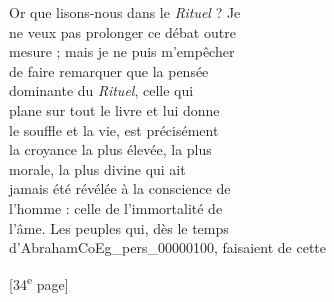 \documentclass{book}
\begin{document}
{\begin{paracol}{2}
Or que lisons-nous dans le \textit{Rituel} ? Je\\
ne veux pas prolonger ce débat outre\\
mesure ; mais je ne puis m’empêcher\\
de faire remarquer que la pensée\\
dominante du \textit{Rituel}, celle qui\\
plane sur tout le livre et lui donne\\
le souffle et la vie, est précisément\\
la croyance la plus élevée, la plus\\
morale, la plus divine qui ait\\
jamais été révélée à la conscience de\\
l’homme : celle de l’immortalité de\\
l’âme. Les peuples qui, dès le temps\\
d’Abraham\gls{CoEg_pers_00000100}, faisaient de cette
\end{paracol}

{\footnotesize\begin{center} {[34\textsuperscript{e} page]}\end{center}}

}
\end{document}
